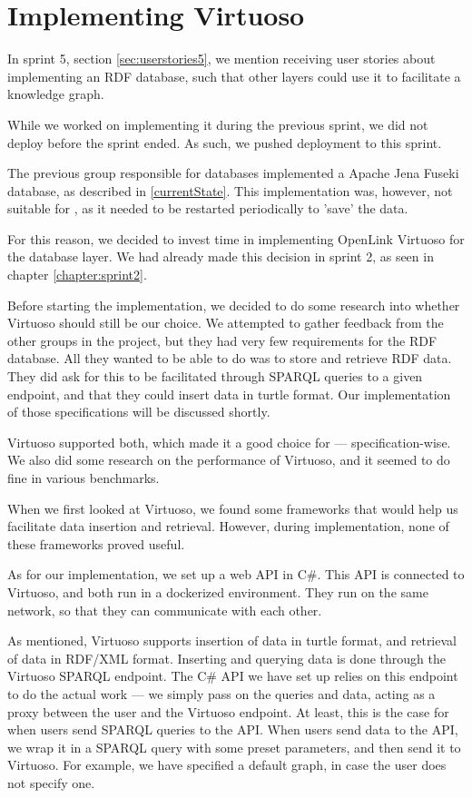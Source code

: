 \section{Implementing Virtuoso}
In sprint 5, section \ref{sec:userstories5}, we mention receiving user stories about implementing an RDF database, such that other \knox{} layers could use it to facilitate a knowledge graph.

While we worked on implementing it during the previous sprint, we did not deploy before the sprint ended. As such, we pushed deployment to this sprint.

The previous group responsible for \knox{} databases implemented a Apache Jena Fuseki database, as described in \ref{currentState}.
This implementation was, however, not suitable for \knox{}, as it needed to be restarted periodically to 'save' the data.

For this reason, we decided to invest time in implementing OpenLink Virtuoso for the \knox{} database layer. We had already made this decision in sprint 2, as seen in chapter \ref{chapter:sprint2}.

Before starting the implementation, we decided to do some research into whether Virtuoso should still be our choice.
We attempted to gather feedback from the other groups in the \knox{} project, but they had very few requirements for the RDF database. All they wanted to be able to do was to store and retrieve RDF data.
They did ask for this to be facilitated through SPARQL queries to a given endpoint, and that they could insert data in turtle format. Our implementation of those specifications will be discussed shortly.

Virtuoso supported both, which made it a good choice for \knox{} --- specification-wise. We also did some research on the performance of Virtuoso, and it seemed to do fine in various benchmarks\cite{addleseeComparingLinkedData2019}\cite{jovanovikBenchmarkingVirtuosoMighty2018}.

When we first looked at Virtuoso, we found some frameworks that would help us facilitate data insertion and retrieval. However, during implementation, none of these frameworks proved useful.

As for our implementation, we set up a web API in C\#. This API is connected to Virtuoso, and both run in a dockerized environment. They run on the same network, so that they can communicate with each other.

As mentioned, Virtuoso supports insertion of data in turtle format, and retrieval of data in RDF/XML format. Inserting and querying data is done through the Virtuoso SPARQL endpoint. The C\# API we have set up relies on this endpoint to do the actual work --- we simply pass on the queries and data, acting as a proxy between the user and the Virtuoso endpoint. At least, this is the case for when users send SPARQL queries to the API. When users send data to the API, we wrap it in a SPARQL query with some preset parameters, and then send it to Virtuoso. For example, we have specified a default graph, in case the user does not specify one.

